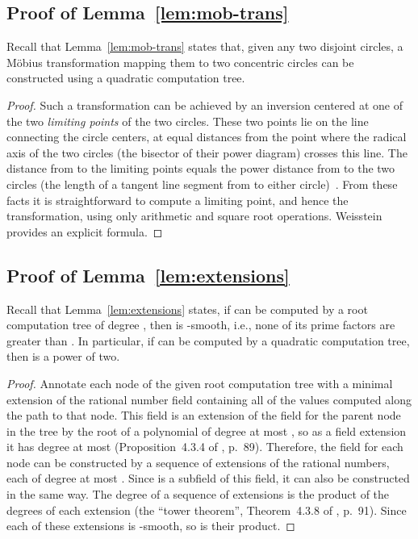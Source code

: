 \documentclass[oribibl,10pt]{llncs}
\begin{document}
\begin{appendix}
\subsection{Proof of Lemma~\ref{lem:mob-trans}}

Recall that Lemma~\ref{lem:mob-trans} states that, given any two disjoint circles, a M\"{o}bius transformation mapping them to two concentric circles can be constructed using a quadratic computation tree.

\begin{proof}
Such a transformation can be achieved by an inversion centered at one of the two \emph{limiting points} of the two circles. These two points lie on the line connecting the circle centers, at equal distances from the point  where the radical axis of the two circles (the bisector of their power diagram) crosses this line. The distance from  to the limiting points equals the power distance from  to the two circles (the length of a tangent line segment from  to either circle)~. From these facts it is straightforward to compute a limiting point, and hence the transformation, using only arithmetic and square root operations. Weisstein~ provides an explicit formula.
\end{proof}

\subsection{Proof of Lemma~\ref{lem:extensions}}
Recall that Lemma~\ref{lem:extensions} states,
if  can be computed by a root computation tree of degree , then  is -smooth, i.e., none of its prime factors are greater than . In particular, if  can be computed by a quadratic computation tree, then  is a power of two.

\begin{proof}
Annotate each node of the given root computation tree with a minimal extension of the rational number field containing all of the values computed along the path to that node. This field is an extension of  the field for the parent node in the tree by the root of a polynomial of degree at most , so as a field extension it has degree at most  (Proposition~4.3.4 of \cite{Cox2012}, p.~89).
Therefore, the field for each node can be constructed by a sequence of extensions of the rational numbers, each of degree at most . Since  is a subfield of this field, it can also be constructed in the same way. The degree of a sequence of extensions is the product of the degrees of each extension (the ``tower theorem'', Theorem~4.3.8 of \cite{Cox2012}, p.~91). Since each of these extensions is -smooth, so is their product.
\end{proof}


\end{appendix}
\end{document}

